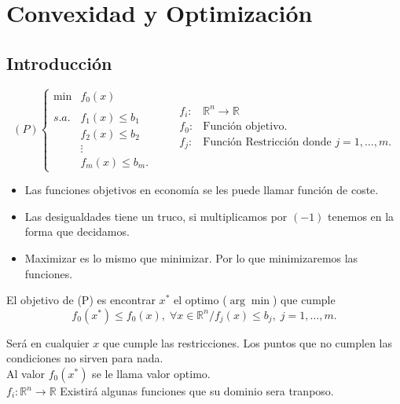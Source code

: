 \chapter{Convexidad y Optimización}

\section{Introducción}

$$
(P)
\left\{
\begin{array}{rl}
    \min & f_0(x)\\\\
    s.a. & f_1(x) \leq b_1\\
	 &f_2(x) \leq b_2\\
	 & \vdots\\
	 & f_m(x) \leq b_m.
\end{array}
\right.
\qquad
\begin{array}{rl}
    f_i: & \mathbb{R}^n \rightarrow \mathbb{R}\\
    f_0 : & \mbox{Función objetivo.}\\
    f_j : & \mbox{Función Restricción donde }j=1,\ldots,m.\\
\end{array}
$$

\begin{itemize}
    \item Las funciones objetivos en economía se les puede llamar función de coste.
    \item Las desigualdades tiene un truco, si multiplicamos por $(-1)$ tenemos en la forma que decidamos.
    \item Maximizar es lo mismo que minimizar. Por lo que minimizaremos las funciones. 
\end{itemize}
\vspace{.5cm}
El objetivo de (P) es encontrar $x^*$ el optimo ($\arg\min$) que cumple 
$$f_0(x^*)\leq f_0(x), \;\forall x\in \mathbb{R}^n / f_j(x)\leq b_j,\; j=1,\ldots,m.$$

Será en cualquier $x$ que cumple las restricciones. Los puntos que no cumplen las condiciones no sirven para nada.\\

Al valor $f_0(x^*)$ se le llama valor optimo.\\

$f_i:  \mathbb{R}^n \rightarrow \mathbb{R}$ Existirá algunas funciones que su dominio sera tranposo.\\

